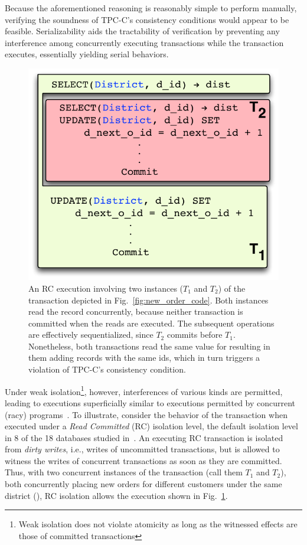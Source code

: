 Because the aforementioned reasoning is reasonably simple to perform
manually, verifying the soundness of TPC-C's consistency conditions
would appear to be feasible.  Serializability aids the tractability of
verification by preventing any interference among concurrently
executing transactions while the  transaction executes,
essentially yielding serial behaviors.  
\begin{figure}
\includegraphics[scale=0.45]{Figures/motiv-eg-1-b}
\caption{\small An RC execution involving two instances ($T_1$ and
  $T_2$) of the  transaction depicted in
  Fig.~\ref{fig:new_order_code}. 
  Both instances read the   record concurrently,
  because neither transaction is committed when the reads are
  executed.  The subsequent operations are effectively sequentialized,
  since $T_2$ commits before $T_1$. Nonetheless, both transactions read the same value for
   resulting in them  adding  records
  with the same ids, which in turn triggers a violation of TPC-C's
  consistency condition.}
\label{fig:new_order_exec}
\vspace*{-10pt}
\end{figure}
Under weak isolation\footnote{Weak isolation does not violate
  atomicity as long as the witnessed effects are those of committed 
transactions}, however, interferences of various kinds are permitted,
leading to executions superficially similar to executions permitted by
concurrent (racy) programs~\cite{GHE15,HPQ+15}.  To illustrate,
consider the behavior of the  transaction when executed
under a \emph{Read Committed} (RC) isolation level, the default
isolation level in 8 of the 18 databases studied
in~\cite{bailishotos}.  An executing RC transaction is isolated from
\emph{dirty writes}, i.e., writes of uncommitted transactions, but is
allowed to witness the writes of concurrent transactions as soon as
they are committed.  Thus, with two concurrent instances of the
 transaction (call them $T_1$ and $T_2$), both
concurrently placing new orders for different customers under the same
district (), RC isolation allows the execution shown in
Fig.~\ref{fig:new_order_exec}.


